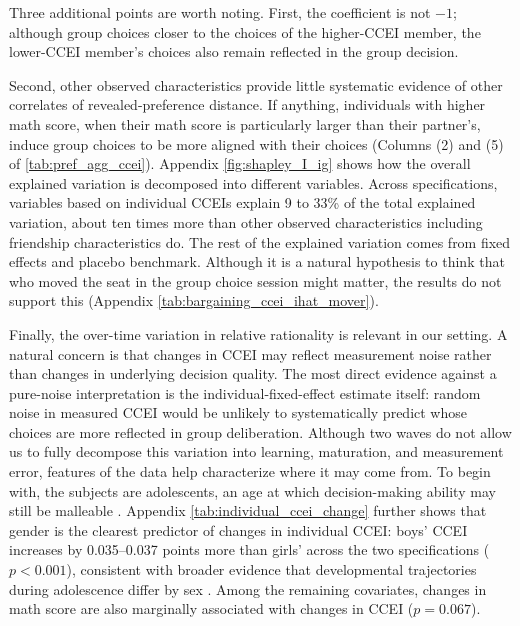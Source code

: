 \documentclass[11 pt]{article}
\begin{document}
Three additional points are worth noting. First, the coefficient is not $-1$; although group choices closer to the choices of the higher-CCEI member, the lower-CCEI member's choices also remain reflected in the group decision.

Second, other observed characteristics provide little systematic evidence of other correlates of revealed-preference distance. If anything, individuals with higher math score, when their math score is particularly larger than their partner's, induce group choices to be more aligned with their choices (Columns (2) and (5) of \autoref{tab:pref_agg_ccei}). %
Appendix \autoref{fig:shapley_I_ig} shows how the overall explained variation is decomposed into different variables. Across specifications, variables based on individual CCEIs explain 9 to 33\% of the total explained variation,  about ten times more than other observed characteristics including friendship characteristics do. The rest of the explained variation comes from fixed effects and placebo benchmark. Although it is a natural hypothesis to think that who moved the seat in the group choice session might matter, the results do not support this (Appendix \autoref{tab:bargaining_ccei_ihat_mover}).

 Finally, the over-time variation in relative rationality is relevant in our setting. A natural concern is that changes in CCEI may reflect measurement noise rather than changes in underlying decision quality. The most direct evidence against a pure-noise interpretation is the individual-fixed-effect estimate itself: random noise in measured CCEI would be unlikely to systematically predict whose choices are more reflected in group deliberation. Although two waves do not allow us to fully decompose this variation into learning, maturation, and measurement error, features of the data help characterize where it may come from. To begin with, the subjects are adolescents, an age at which decision-making ability may still be malleable \citep{kim2018role}. Appendix \autoref{tab:individual_ccei_change} further shows that gender is the clearest predictor of changes in individual CCEI: boys' CCEI increases by 0.035--0.037 points more than girls' across the two specifications ($p<0.001$), consistent with broader evidence that developmental trajectories during adolescence differ by sex \citep{lenroot2010sex}. Among the remaining covariates, changes in math score are also marginally associated with changes in CCEI ($p=0.067$).
\end{document}
